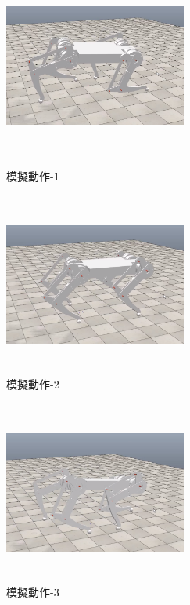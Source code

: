 \begin{figure}[htbp]
  \begin{minipage}[t]{0.5\linewidth}
    \centering
    \includegraphics[height=6cm,width=6cm]{模擬動作-1}
    \caption{模擬動作-1}
    \label{模擬動作-1}
  \end{minipage}
  \hfill
  \begin{minipage}[t]{0.5\linewidth}
    \centering
    \includegraphics[height=6cm,width=6cm]{模擬動作-2}
    \caption{模擬動作-2}
    \label{模擬動作-2}
  \end{minipage}
\end{figure}

\begin{figure}[hbt!]
\begin{center}
\includegraphics[height=6cm,width=6cm]{模擬動作-3}
\caption{\Large 模擬動作-3}\label{模擬動作-3}
\end{center}
\end{figure}
\newpage
